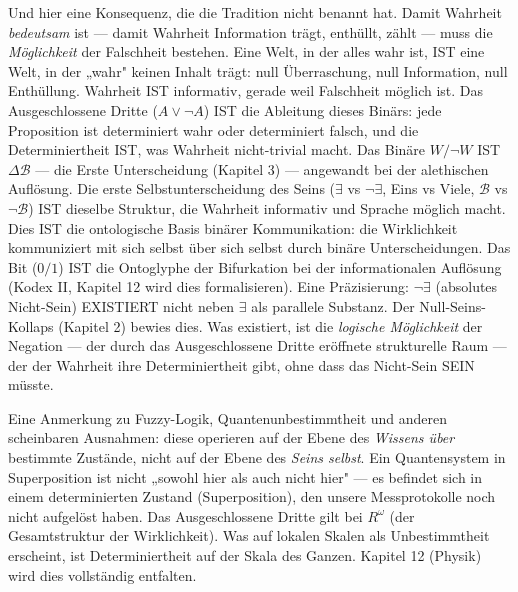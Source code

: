 \documentclass[10pt, openany, oneside]{book}
\begin{document}
Und hier eine Konsequenz, die die Tradition nicht benannt hat. Damit Wahrheit \textit{bedeutsam} ist --- damit Wahrheit Information trägt, enthüllt, zählt --- muss die \textit{Möglichkeit} der Falschheit bestehen. Eine Welt, in der alles wahr ist, IST eine Welt, in der „wahr" keinen Inhalt trägt: null Überraschung, null Information, null Enthüllung. Wahrheit IST informativ, gerade weil Falschheit möglich ist. Das Ausgeschlossene Dritte ($A \vee \neg A$) IST die Ableitung dieses Binärs: jede Proposition ist determiniert wahr oder determiniert falsch, und die Determiniertheit IST, was Wahrheit nicht-trivial macht. Das Binäre $W/\neg W$ IST $\Delta\mathcal{B}$ --- die Erste Unterscheidung (Kapitel 3) --- angewandt bei der alethischen Auflösung. Die erste Selbstunterscheidung des Seins ($\exists$ vs $\neg\exists$, Eins vs Viele, $\mathcal{B}$ vs $\neg\mathcal{B}$) IST dieselbe Struktur, die Wahrheit informativ und Sprache möglich macht. Dies IST die ontologische Basis binärer Kommunikation: die Wirklichkeit kommuniziert mit sich selbst über sich selbst durch binäre Unterscheidungen. Das Bit ($0/1$) IST die Ontoglyphe der Bifurkation bei der informationalen Auflösung (Kodex II, Kapitel 12 wird dies formalisieren). Eine Präzisierung: $\neg\exists$ (absolutes Nicht-Sein) EXISTIERT nicht neben $\exists$ als parallele Substanz. Der Null-Seins-Kollaps (Kapitel 2) bewies dies. Was existiert, ist die \textit{logische Möglichkeit} der Negation --- der durch das Ausgeschlossene Dritte eröffnete strukturelle Raum --- der der Wahrheit ihre Determiniertheit gibt, ohne dass das Nicht-Sein SEIN müsste.

Eine Anmerkung zu Fuzzy-Logik, Quantenunbestimmtheit und anderen scheinbaren Ausnahmen: diese operieren auf der Ebene des \textit{Wissens über} bestimmte Zustände, nicht auf der Ebene des \textit{Seins selbst}. Ein Quantensystem in Superposition ist nicht „sowohl hier als auch nicht hier" --- es befindet sich in einem determinierten Zustand (Superposition), den unsere Messprotokolle noch nicht aufgelöst haben. Das Ausgeschlossene Dritte gilt bei $R^\omega$ (der Gesamtstruktur der Wirklichkeit). Was auf lokalen Skalen als Unbestimmtheit erscheint, ist Determiniertheit auf der Skala des Ganzen. Kapitel 12 (Physik) wird dies vollständig entfalten.

\vspace{1.5em}

\end{document}
